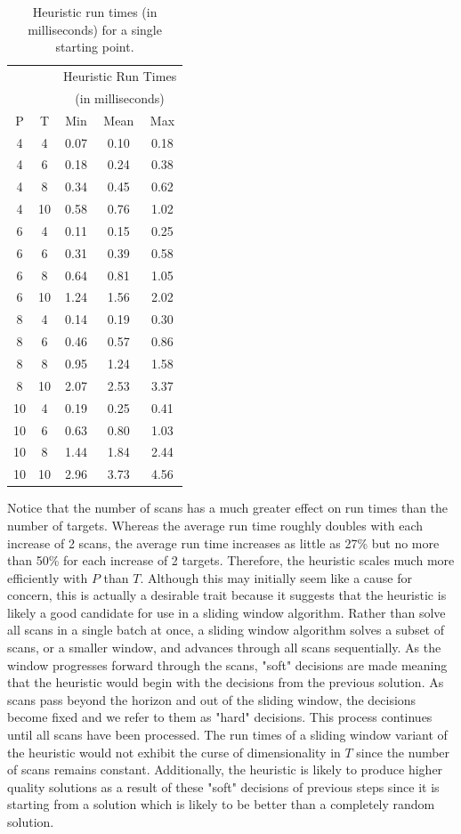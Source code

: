 \begin{table}[ht]
\centering
\begin{tabular}{cc|ccc}
  \hline
   & & \multicolumn{3}{c}{Heuristic Run Times } \\
   & & \multicolumn{3}{c}{(in milliseconds)}\\
   P & T & Min & Mean & Max \\ 
  \hline
  \hline
   4 & 4 & 0.07 & 0.10 & 0.18 \\ 
   4 & 6 & 0.18 & 0.24 & 0.38 \\ 
   4 & 8 & 0.34 & 0.45 & 0.62 \\ 
   4 & 10 & 0.58 & 0.76 & 1.02 \\ 
   6 & 4 & 0.11 & 0.15 & 0.25 \\ 
   6 & 6 & 0.31 & 0.39 & 0.58 \\ 
   6 & 8 & 0.64 & 0.81 & 1.05 \\ 
   6 & 10 & 1.24 & 1.56 & 2.02 \\ 
   8 & 4 & 0.14 & 0.19 & 0.30 \\ 
   8 & 6 & 0.46 & 0.57 & 0.86 \\ 
   8 & 8 & 0.95 & 1.24 & 1.58 \\ 
   8 & 10 & 2.07 & 2.53 & 3.37 \\ 
   10 & 4 & 0.19 & 0.25 & 0.41 \\ 
   10 & 6 & 0.63 & 0.80 & 1.03 \\ 
   10 & 8 & 1.44 & 1.84 & 2.44 \\ 
   10 & 10 & 2.96 & 3.73 & 4.56 \\ 
   \hline
\end{tabular}
\caption{Heuristic run times (in milliseconds) for a single starting point.}
\label{tab:Basic_heuristic_times}
\end{table}

Notice that the number of scans has a much greater effect on run times than the number of targets. Whereas the average run time roughly doubles with each increase of 2 scans, the average run time increases as little as 27\% but no more than 50\% for each increase of 2 targets. Therefore, the heuristic scales much more efficiently with $P$ than $T$. Although this may initially seem like a cause for concern, this is actually a desirable trait because it suggests that the heuristic is likely a good candidate for use in a sliding window algorithm. Rather than solve all scans in a single batch at once, a sliding window algorithm solves a subset of scans, or a smaller window, and advances through all scans sequentially.  As the window progresses forward through the scans, "soft" decisions are made meaning that the heuristic would begin with the decisions from the previous solution. As scans pass beyond the horizon and out of the sliding window, the decisions become fixed and we refer to them as "hard" decisions. This process continues until all scans have been processed. The run times of a sliding window variant of the heuristic would not exhibit the curse of dimensionality in $T$ since the number of scans remains constant. Additionally, the heuristic is likely to produce higher quality solutions as a result of these "soft" decisions of previous steps since it is starting from a solution which is likely to be better than a completely random solution. 


